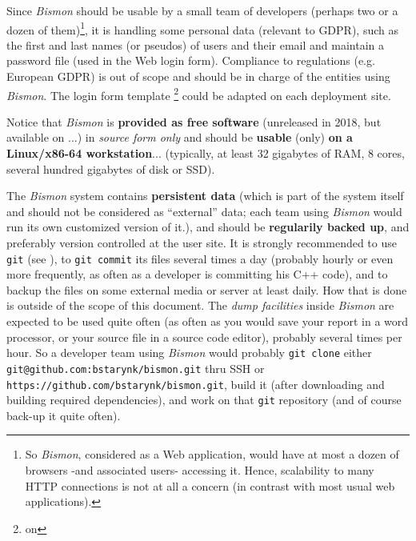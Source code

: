\begin{itemize}
      Since \textit{Bismon} should be usable by a small team of
      developers (perhaps two or a dozen of them)\footnote{So
        \textit{Bismon}, considered as a Web application, would have
        at most a dozen of browsers -and associated users- accessing
        it. Hence, scalability to many HTTP connections is not at all
        a concern (in contrast with most usual web applications).}, it
      is handling some personal data (relevant to GDPR), such as the
      first and last names (or pseudos) of users and their email and
      maintain a password file (used in the Web login
      form). Compliance to regulations (e.g. European GDPR) is out of
      scope and should be in charge of the entities using
      \textit{Bismon}. The login form template \footnote{on
      }
      could be adapted on each deployment site.
\end{itemize}

Notice that \textit{Bismon} is \textbf{provided as free software}
(unreleased in 2018, but available on
 ...) in \emph{source form only} and
should be \textbf{usable} (only) \textbf{on a Linux/x86-64
  workstation}... (typically, at least 32 gigabytes of RAM, 8 cores,
several hundred gigabytes of disk or SSD).

The \textit{Bismon} system contains \textbf{persistent data} (which is
part of the system itself and should not be considered as ``external''
data; each team using \textit{Bismon} would run its own customized
version of it.), and should be \textbf{regularily backed up}, and
preferably version controlled at the user site. It is strongly
recommended to use \texttt{git} (see ), to
\texttt{git commit} its files several times a day (probably hourly or
even more frequently, as often as a developer is committing his C++
code), and to backup the files on some external media or server at
least daily. How that is done is outside of the scope of this
document. The \emph{dump facilities} inside \textit{Bismon} are
expected to be used quite often (as often as you would save your
report in a word processor, or your source file in a source code
editor), probably several times per hour. So a developer team using
\textit{Bismon} would probably \texttt{git clone} either
\texttt{git@github.com:bstarynk/bismon.git} thru SSH or
\texttt{https://github.com/bstarynk/bismon.git}, build it (after
downloading and building required dependencies), and work on that
\texttt{git} repository (and of course back-up it quite often).


